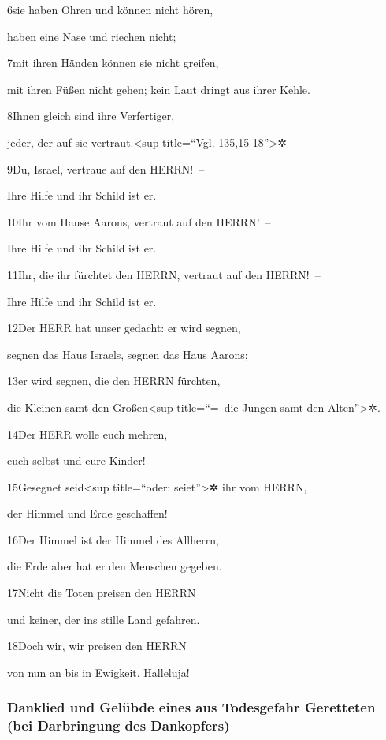 6sie haben Ohren und können nicht hören,

haben eine Nase und riechen nicht;

7mit ihren Händen können sie nicht greifen,

mit ihren Füßen nicht gehen; kein Laut dringt aus ihrer Kehle.

8Ihnen gleich sind ihre Verfertiger,

jeder, der auf sie vertraut.\textless sup title=``Vgl.
135,15-18''\textgreater✲

9Du, Israel, vertraue auf den HERRN!~--

Ihre Hilfe und ihr Schild ist er.

10Ihr vom Hause Aarons, vertraut auf den HERRN!~--

Ihre Hilfe und ihr Schild ist er.

11Ihr, die ihr fürchtet den HERRN, vertraut auf den HERRN!~--

Ihre Hilfe und ihr Schild ist er.

12Der HERR hat unser gedacht: er wird segnen,

segnen das Haus Israels, segnen das Haus Aarons;

13er wird segnen, die den HERRN fürchten,

die Kleinen samt den Großen\textless sup title=``=~die Jungen samt den
Alten''\textgreater✲.

14Der HERR wolle euch mehren,

euch selbst und eure Kinder!

15Gesegnet seid\textless sup title=``oder: seiet''\textgreater✲ ihr vom
HERRN,

der Himmel und Erde geschaffen!

16Der Himmel ist der Himmel des Allherrn,

die Erde aber hat er den Menschen gegeben.

17Nicht die Toten preisen den HERRN

und keiner, der ins stille Land gefahren.

18Doch wir, wir preisen den HERRN

von nun an bis in Ewigkeit. Halleluja!

\hypertarget{danklied-und-geluxfcbde-eines-aus-todesgefahr-geretteten-bei-darbringung-des-dankopfers}{%
\subsubsection{Danklied und Gelübde eines aus Todesgefahr Geretteten
(bei Darbringung des
Dankopfers)}\label{danklied-und-geluxfcbde-eines-aus-todesgefahr-geretteten-bei-darbringung-des-dankopfers}}

